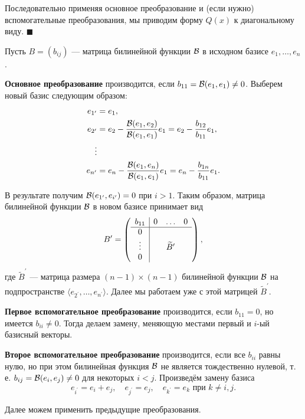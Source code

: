 Последовательно применяя основное преобразование и (если нужно) вспомогательные преобразования, мы приводим форму $Q(x)$ к диагональному виду.
\hfill$\blacksquare$\par\smallskip

\smallskip
{}
Пусть $B = (b_{ij})$ --- матрица билинейной функции $\mathcal{B}$ в исходном базисе $e_1, \ldots, e_n$.

\textbf{Основное преобразование} производится, если $b_{11} = \mathcal{B}(e_1, e_1) \ne 0$. Выберем новый базис следующим образом:
\begin{align*}
    e_{1^\prime} &= e_1,\\
    e_{2^\prime} &= e_2 - \frac{\mathcal{B}(e_1, e_2)}{\mathcal{B}(e_1, e_1)}e_1 = e_2 - \frac{b_{12}}{b_{11}}e_1,\\
    \vdots\\
    e_{n^\prime} &= e_n - \frac{\mathcal{B}(e_1, e_n)}{\mathcal{B}(e_1, e_1)}e_1 = e_n - \frac{b_{1n}}{b_{11}}e_1.
\end{align*}

В результате получим $\mathcal{B}(e_{1^\prime}, e_{i^\prime}) = 0$ при $i > 1$. Таким образом, матрица билинейной функции $\mathcal{B}$ в новом базисе принимает вид
\[
    B^\prime =
    \left(
    \begin{array}{c | c c c}
        b_{11} & 0 & \ldots & 0\\
        \hline
        0 & & & \\
        \vdots & & \widetilde{B}^\prime & \\
        0 & & & 
    \end{array}
    \right),
\]
где $\widetilde{B}^\prime$ --- матрица размера $(n - 1) \times (n - 1)$ билинейной функции $\mathcal{B}$ на подпространстве $\langle e_{2^\prime}, \ldots, e_{n^\prime} \rangle$. Далее мы работаем уже с этой матрицей $\widetilde{B}^\prime$.

\textbf{Первое вспомогательное преобразование} производится, если $b_{11} = 0$, но имеется $b_{ii} \ne 0$. Тогда делаем замену, меняющую местами первый и $i$-ый базисный векторы.

\textbf{Второе вспомогательное преобразование} производится, если все $b_{ii}$ равны нулю, но при этом билинейная функция $\mathcal{B}$ не является тождественно нулевой, т.\,е. $b_{ij} = \mathcal{B}(e_i, e_j) \ne 0$ для некоторых $i < j$. Произведём замену базиса
\[
    e_{i^\prime} = e_i + e_j,\quad e_{j^\prime} = e_j,\quad e_{k^\prime} = e_k\text{ при $k \ne i, j$}.
\]

Далее можем применить предыдущие преобразования.

